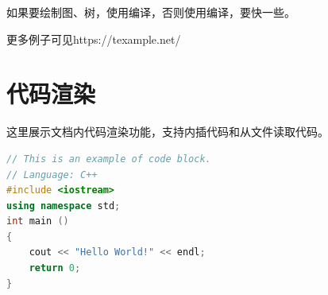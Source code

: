 \documentclass{gjm_hw}
\begin{document}
    如果要绘制图、树，使用编译，否则使用编译，要快一些。
    
    \begin{center}
    \end{center}
    
    更多例子可见https://texample.net/
    

  \section{代码渲染}
  
  这里展示文档内代码渲染功能，支持内插代码和从文件读取代码。
  
  \begin{lstlisting}[language=C++, title=Example Code 1]
// This is an example of code block.
// Language: C++
#include <iostream>
using namespace std;
int main ()
{
	cout << "Hello World!" << endl;
	return 0;
}
  \end{lstlisting}
	
  
\end{document}
